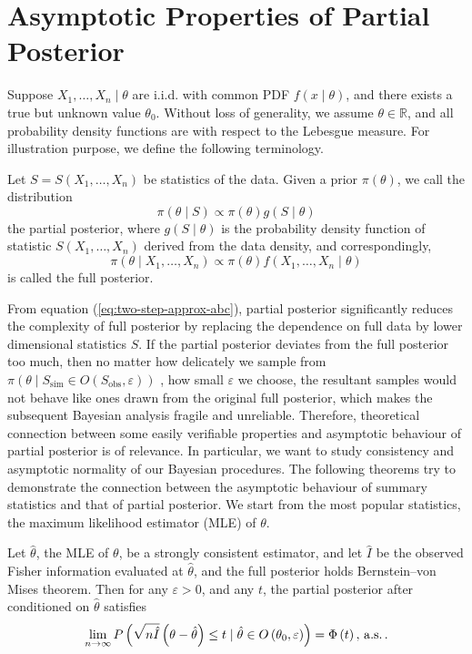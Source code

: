 \section{\label{sec:asymp-partial-post}Asymptotic Properties of Partial Posterior}

Suppose $X_{1},\ldots,X_{n}\mid\theta$ are i.i.d. with common PDF
$f\left(x\mid\theta\right)$, and there exists a true but unknown
value $\theta_{0}$. Without loss of generality, we assume $\theta\in\mathbb{R}$,
and all probability density functions are with respect to the Lebesgue
measure. For illustration purpose, we define the following terminology.
\begin{defn}
Let $S=S\left(X_{1},\ldots,X_{n}\right)$ be{} {statistics
} of the data. Given a prior $\pi\left(\theta\right)$,
we call the distribution 
\[
\pi\left(\theta\mid S\right)\propto\pi\left(\theta\right)g\left(S\mid\theta\right)
\]
the partial posterior, where $g\left(S\mid\theta\right)$ is the probability
density function of statistic $S\left(X_{1},\ldots,X_{n}\right)$
derived from the data density, and correspondingly, 
\[
\pi\left(\theta\mid X_{1},\ldots,X_{n}\right)\propto\pi\left(\theta\right)f\left(X_{1},\ldots,X_{n}\mid\theta\right)
\]
 is called the full posterior.
\end{defn}
From equation (\ref{eq:two-step-approx-abc}), partial posterior significantly
reduces the complexity of full posterior by replacing the dependence
on full data by lower dimensional statistics $S$. If the partial
posterior deviates from {the } full
posterior too much, then no matter how delicately we sample from $\pi\left(\theta\mid S_{\mathrm{sim}}\in O\left(S_{\mathrm{obs}},\varepsilon\right)\right)$
, how small $\varepsilon$ we choose, the resultant samples would
not behave like ones drawn from the original full posterior, which {makes } the subsequent Bayesian analysis fragile
and unreliable. Therefore, theoretical connection between some easily
verifiable properties and asymptotic behaviour of partial posterior
is of relevance. In particular, we want to study consistency and asymptotic
normality of our Bayesian procedures. The following theorems try to
demonstrate the connection between the asymptotic behaviour of summary
statistics and that of partial posterior. We start from the most popular
statistics, the maximum likelihood estimator (MLE) of $\theta$. 
\begin{thm}
\label{thm:bernstein-von-mises-mle}Let $\hat{\theta}$, the MLE of
$\theta$, be a strongly consistent estimator, and let $\hat{I}$
be the observed Fisher information evaluated at $\hat{\theta}$, and
the full posterior holds Bernstein--von Mises theorem. Then for any
$\varepsilon>0$, and any $t$, the partial posterior after conditioned
on $\hat{\theta}$ satisfies 
\[
\lim_{n\rightarrow\infty}P\left(\sqrt{n\hat{I}}\left(\theta-\hat{\theta}\right)\le t\mid\hat{\theta}\in O\left(\theta_{0},\varepsilon\right)\right)=\Phi\left(t\right),\,\mathrm{a.s.}\,.
\]
\end{thm}
